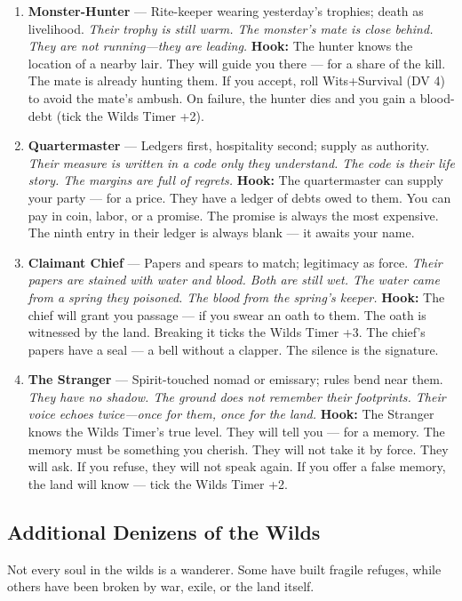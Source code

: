 \begin{enumerate}
\item[J] \textbf{Monster-Hunter} --- Rite-keeper wearing yesterday's trophies; death as livelihood.
  \hfill \textit{Their trophy is still warm. The monster's mate is close behind. They are not running---they are leading.}
  \textbf{Hook:} The hunter knows the location of a nearby lair. They will guide you there --- for a share of the kill. The mate is already hunting them. If you accept, roll Wits+Survival (DV 4) to avoid the mate's ambush. On failure, the hunter dies and you gain a blood-debt (tick the Wilds Timer +2).
  
\item[Q] \textbf{Quartermaster} --- Ledgers first, hospitality second; supply as authority.
  \hfill \textit{Their measure is written in a code only they understand. The code is their life story. The margins are full of regrets.}
  \textbf{Hook:} The quartermaster can supply your party --- for a price. They have a ledger of debts owed to them. You can pay in coin, labor, or a promise. The promise is always the most expensive. The ninth entry in their ledger is always blank --- it awaits your name.
  
\item[K] \textbf{Claimant Chief} --- Papers and spears to match; legitimacy as force.
  \hfill \textit{Their papers are stained with water and blood. Both are still wet. The water came from a spring they poisoned. The blood from the spring's keeper.}
  \textbf{Hook:} The chief will grant you passage --- if you swear an oath to them. The oath is witnessed by the land. Breaking it ticks the Wilds Timer +3. The chief's papers have a seal --- a bell without a clapper. The silence is the signature.
  
\item[A] \textbf{The Stranger} --- Spirit-touched nomad or emissary; rules bend near them.
  \hfill \textit{They have no shadow. The ground does not remember their footprints. Their voice echoes twice---once for them, once for the land.}
  \textbf{Hook:} The Stranger knows the Wilds Timer's true level. They will tell you --- for a memory. The memory must be something you cherish. They will not take it by force. They will ask. If you refuse, they will not speak again. If you offer a false memory, the land will know --- tick the Wilds Timer +2.
\end{enumerate}

\subsection*{Additional Denizens of the Wilds}
\label{sec:wilderness-extra-denizens}
Not every soul in the wilds is a wanderer. Some have built fragile refuges, while others have been broken by war, exile, or the land itself.

